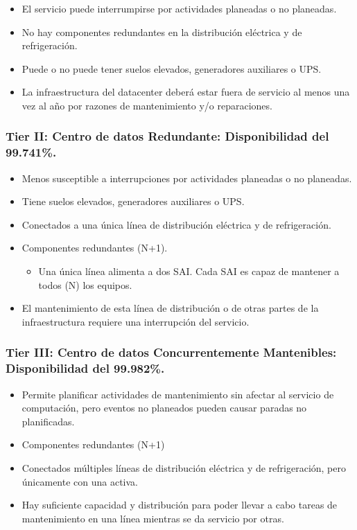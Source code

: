 \documentclass[a4paper]{article}
\begin{document}
\begin{itemize}
\item El servicio puede interrumpirse por actividades planeadas o no planeadas.
\item No hay componentes redundantes en la distribución eléctrica y de refrigeración.
\item Puede o no puede tener suelos elevados, generadores auxiliares o UPS.
\item La infraestructura del datacenter deberá estar fuera de servicio al menos una vez al año por razones de mantenimiento y/o reparaciones.
\end{itemize}
\subsubsection{Tier II: Centro de datos Redundante: Disponibilidad del 99.741\%.}
\label{sec:org000003f}
\begin{itemize}
\item Menos susceptible a interrupciones por actividades planeadas o no planeadas.
\item Tiene suelos elevados, generadores auxiliares o UPS.
\item Conectados a una única línea de distribución eléctrica y de refrigeración.
\item Componentes redundantes (N+1). 
\begin{itemize}
\item Una única línea alimenta a dos SAI. Cada SAI es capaz de mantener a todos (N) los equipos.
\end{itemize}
\item El mantenimiento de esta línea de distribución o de otras partes de la infraestructura requiere una interrupción del servicio.
\end{itemize}
\subsubsection{Tier III: Centro de datos Concurrentemente Mantenibles: Disponibilidad del 99.982\%.}
\label{sec:org0000042}

\begin{itemize}
\item Permite planificar actividades de mantenimiento sin afectar al servicio de computación, pero eventos no planeados pueden causar paradas no planificadas.
\item Componentes redundantes (N+1)
\item Conectados  múltiples líneas de distribución eléctrica y de refrigeración, pero únicamente con una activa.
\item Hay suficiente capacidad y distribución para poder llevar a cabo tareas de mantenimiento en una línea mientras se da servicio por otras.
\end{itemize}
\end{document}
